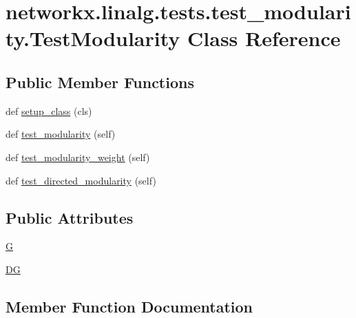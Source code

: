 \hypertarget{classnetworkx_1_1linalg_1_1tests_1_1test__modularity_1_1TestModularity}{}\section{networkx.\+linalg.\+tests.\+test\+\_\+modularity.\+Test\+Modularity Class Reference}
\label{classnetworkx_1_1linalg_1_1tests_1_1test__modularity_1_1TestModularity}
\subsection*{Public Member Functions}
\begin{DoxyCompactItemize}
\item 
def \hyperlink{classnetworkx_1_1linalg_1_1tests_1_1test__modularity_1_1TestModularity_ae27def032e3f09e62a17761e107b04bf}{setup\+\_\+class} (cls)
\item 
def \hyperlink{classnetworkx_1_1linalg_1_1tests_1_1test__modularity_1_1TestModularity_af1eff73fffe507035237d53def2dca16}{test\+\_\+modularity} (self)
\item 
def \hyperlink{classnetworkx_1_1linalg_1_1tests_1_1test__modularity_1_1TestModularity_a508cd03ce2b81abd2bdf27e5f28f6274}{test\+\_\+modularity\+\_\+weight} (self)
\item 
def \hyperlink{classnetworkx_1_1linalg_1_1tests_1_1test__modularity_1_1TestModularity_afef63d527359f00e5cd0ffeb2de2d43a}{test\+\_\+directed\+\_\+modularity} (self)
\end{DoxyCompactItemize}
\subsection*{Public Attributes}
\begin{DoxyCompactItemize}
\item 
\hyperlink{classnetworkx_1_1linalg_1_1tests_1_1test__modularity_1_1TestModularity_a8b9e637d541ba9efb9a6d9388577e53f}{G}
\item 
\hyperlink{classnetworkx_1_1linalg_1_1tests_1_1test__modularity_1_1TestModularity_ab006453945a66099cb0d83233a5c88bf}{DG}
\end{DoxyCompactItemize}


\subsection{Member Function Documentation}
\mbox{\label{classnetworkx_1_1linalg_1_1tests_1_1test__modularity_1_1TestModularity_ae27def032e3f09e62a17761e107b04bf}} 
